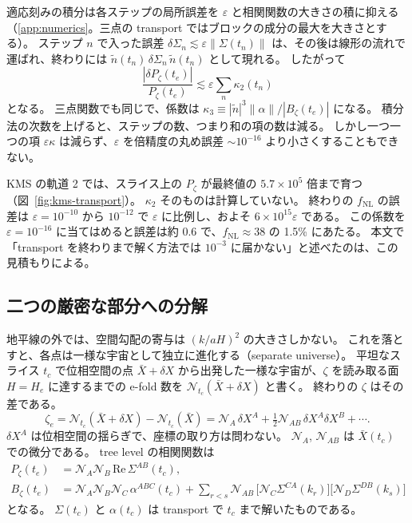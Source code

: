 \documentclass[a4paper,11pt]{ltjsarticle}
\newcommand{\fnl}{f_{\mathrm{NL}}}
\begin{document}
適応刻みの積分は各ステップの局所誤差を $\varepsilon$ と相関関数の大きさの積に抑える（\ref{app:numerics}。三点の transport ではブロックの成分の最大を大きさとする）。
ステップ $n$ で入った誤差 $\delta\Sigma_n\lesssim\varepsilon\|\Sigma(t_n)\|$ は、その後は線形の流れで運ばれ、終わりには $\tilde n(t_n)\,\delta\Sigma_n\,\tilde n(t_n)$ として現れる。
したがって
\begin{equation}
\frac{|\delta P_\zeta(t_e)|}{P_\zeta(t_e)}\lesssim\varepsilon\sum_n\kappa_2(t_n)
\end{equation}
となる。
三点関数でも同じで、係数は $\kappa_3\equiv|\tilde n|^3\|\alpha\|/|B_\zeta(t_e)|$ になる。
積分法の次数を上げると、ステップの数、つまり和の項の数は減る。
しかし一つ一つの項 $\varepsilon\kappa$ は減らず、$\varepsilon$ を倍精度の丸め誤差 $\sim10^{-16}$ より小さくすることもできない。

KMS の軌道 2 では、スライス上の $P_\zeta$ が最終値の $5.7\times10^5$ 倍まで育つ（図~\ref{fig:kms-transport}）。
$\kappa_2$ そのものは計算していない。
終わりの $\fnl$ の誤差は $\varepsilon=10^{-10}$ から $10^{-12}$ で $\varepsilon$ に比例し、およそ $6\times10^{15}\varepsilon$ である。
この係数を $\varepsilon=10^{-16}$ に当てはめると誤差は約 0.6 で、$\fnl\approx38$ の 1.5\% にあたる。
本文で「transport を終わりまで解く方法では $10^{-3}$ に届かない」と述べたのは、この見積もりによる。

\subsection{二つの厳密な部分への分解}

地平線の外では、空間勾配の寄与は $(k/aH)^2$ の大きさしかない。
これを落とすと、各点は一様な宇宙として独立に進化する（separate universe）。
平坦なスライス $t_c$ で位相空間の点 $\bar X+\delta X$ から出発した一様な宇宙が、$\zeta$ を読み取る面 $H=H_e$ に達するまでの e-fold 数を $\mathcal N_{t_c}(\bar X+\delta X)$ と書く。
終わりの $\zeta$ はその差である。
\begin{equation}
\zeta_e=\mathcal N_{t_c}(\bar X+\delta X)-\mathcal N_{t_c}(\bar X)
=\mathcal N_A\,\delta X^A+\tfrac12\mathcal N_{AB}\,\delta X^A\delta X^B+\cdots .
\end{equation}
$\delta X^A$ は位相空間の揺らぎで、座標の取り方は問わない。
$\mathcal N_A$, $\mathcal N_{AB}$ は $\bar X(t_c)$ での微分である。
tree level の相関関数は
\begin{align}
P_\zeta(t_e)&=\mathcal N_A\mathcal N_B\,\mathrm{Re}\,\Sigma^{AB}(t_c),\\
B_\zeta(t_e)&=\mathcal N_A\mathcal N_B\mathcal N_C\,\alpha^{ABC}(t_c)
+\sum_{r<s}\mathcal N_{AB}\,\big[\mathcal N_C\Sigma^{CA}(k_r)\big]\big[\mathcal N_D\Sigma^{DB}(k_s)\big]
\label{eq:split}
\end{align}
となる。
$\Sigma(t_c)$ と $\alpha(t_c)$ は transport で $t_c$ まで解いたものである。
\end{document}
